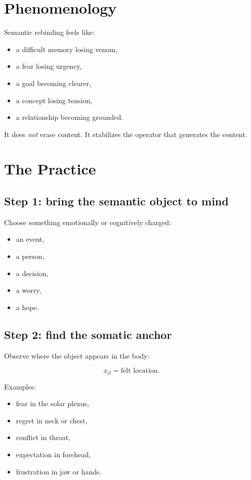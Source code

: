\documentclass[12pt]{article}
\begin{document}
\section{Phenomenology}

Semantic rebinding feels like:

\begin{itemize}
    \item a difficult memory losing venom,
    \item a fear losing urgency,
    \item a goal becoming clearer,
    \item a concept losing tension,
    \item a relationship becoming grounded.
\end{itemize}

It does \emph{not} erase content.  
It stabilizes the operator that generates the content.

\section{The Practice}

\subsection*{Step 1: bring the semantic object to mind}

Choose something emotionally or cognitively charged:

\begin{itemize}
    \item an event,
    \item a person,
    \item a decision,
    \item a worry,
    \item a hope.
\end{itemize}

\subsection*{Step 2: find the somatic anchor}

Observe where the object appears in the body:

\[
x_{\mathcal{O}} = \text{felt location}.
\]

Examples:

\begin{itemize}
    \item fear in the solar plexus,
    \item regret in neck or chest,
    \item conflict in throat,
    \item expectation in forehead,
    \item frustration in jaw or hands.
\end{itemize}
\end{document}
